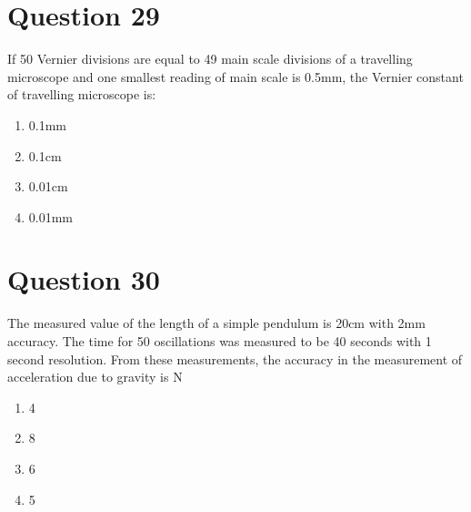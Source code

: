 \documentclass{article}
\begin{document}
\section*{Question 29}
If 50 Vernier divisions are equal to 49 main scale divisions of a travelling microscope and one smallest reading of main scale is 0.5mm, the Vernier constant of travelling microscope is: 
\begin{enumerate}[label=(\alph*)]
\item 0.1mm
\item 0.1cm
\item 0.01cm
\item 0.01mm
\end{enumerate}
\newpage
\section*{Question 30}
The measured value of the length of a simple pendulum is 20cm with 2mm accuracy. The time for 50 oscillations was measured to be 40 seconds with 1 second resolution. From these measurements, the accuracy in the measurement of acceleration due to gravity is N%
\begin{enumerate}[label=(\alph*)]
\item 4
\item 8
\item 6
\item 5
\end{enumerate}
\newpage
\end{document}
